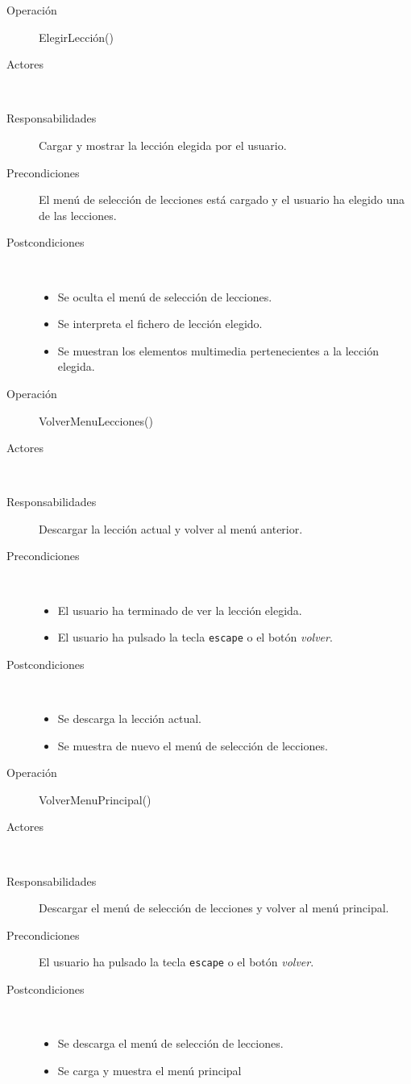 \begin{description}
\item[Operación] ElegirLección()
\item[Actores] \jugador\, \sistema\
\item[Responsabilidades] Cargar y mostrar la lección elegida por el usuario.
\item[Precondiciones] El menú de selección de lecciones está cargado y el
  usuario ha elegido una de las lecciones.
\item[Postcondiciones]$\quad$
  \begin{itemize}
  \item Se oculta el menú de selección de lecciones.
  \item Se interpreta el fichero de lección elegido.
  \item Se muestran los elementos multimedia pertenecientes a la lección
    elegida.
  \end{itemize}
\end{description}

\begin{description}
\item[Operación] VolverMenuLecciones()
\item[Actores] \jugador\, \sistema\
\item[Responsabilidades] Descargar la lección actual y volver al menú anterior.
\item[Precondiciones] $\quad$
  \begin{itemize}
  \item El usuario ha terminado de ver la lección elegida.
  \item El usuario ha pulsado la tecla \texttt{escape} o el botón \textit{volver}.
  \end{itemize}
\item[Postcondiciones] $\quad$
  \begin{itemize}
  \item Se descarga la lección actual.
  \item Se muestra de nuevo el menú de selección de lecciones.
  \end{itemize}
\end{description}

\begin{description}
\item[Operación] VolverMenuPrincipal()
\item[Actores] \jugador\, \sistema\
\item[Responsabilidades] Descargar el menú de selección de lecciones y volver al
  menú principal.
\item[Precondiciones] El usuario ha pulsado la tecla \texttt{escape} o el botón \textit{volver}.
\item[Postcondiciones] $\quad$
  \begin{itemize}
  \item Se descarga el menú de selección de lecciones.
  \item Se carga y muestra el menú principal
  \end{itemize}
\end{description}

